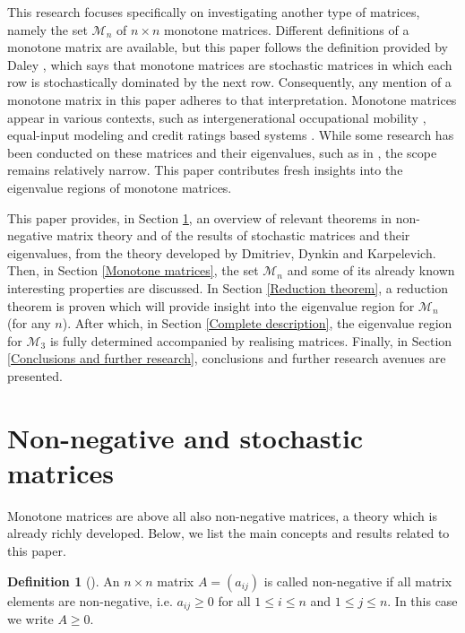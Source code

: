 \documentclass[11pt,a4paper]{article}
\theoremstyle{definition}
\newtheorem{definition}{Definition}[section]
\theoremstyle{remark}
\begin{document}
This research focuses specifically on investigating another type of matrices, namely the set $\mathcal{M}_n$ of $n \times n$ monotone matrices. Different definitions of a monotone matrix are available, but this paper follows the definition provided by Daley \cite{daley1968stochastically}, which says that monotone matrices are stochastic matrices in which each row is stochastically dominated by the next row. Consequently, any mention of a monotone matrix in this paper adheres to that interpretation. Monotone matrices appear in various contexts, such as intergenerational occupational mobility \cite{conlisk1990monotone}, equal-input modeling \cite{baake2022equal} and credit ratings based 
systems \cite{jarrow1997markov}. While some research has been conducted on these matrices and their eigenvalues, such as in \cite{guerry2022monotone}, the scope remains relatively narrow. This paper contributes fresh insights into the eigenvalue regions of monotone matrices.

This paper provides, in Section \ref{Non-negative and stochastic matrices}, an overview of relevant theorems in non-negative matrix theory and of the results of stochastic matrices and their eigenvalues, from the theory developed by Dmitriev, Dynkin and Karpelevich. Then, in Section \ref{Monotone matrices}, the set $\mathcal{M}_n$ and some of its already known interesting properties are discussed. In Section \ref{Reduction theorem}, a reduction theorem is proven which will provide insight into the eigenvalue region for $\mathcal{M}_n$ (for any $n$). After which, in Section \ref{Complete description}, the eigenvalue region for $\mathcal{M}_3$ is fully determined accompanied by realising matrices. Finally, in Section \ref{Conclusions and further research}, conclusions and further research avenues are presented.

\section{Non-negative and stochastic matrices}\label{Non-negative and stochastic matrices}

Monotone matrices are above all also non-negative matrices, a theory which is already richly developed. Below, we list the main concepts and results related to this paper.

\begin{definition}[\cite{seneta1973non}]
    An \(n \times n\) matrix \(A=(a_{ij})\) is called non-negative if all matrix elements are non-negative, i.e. \(a_{ij} \geqslant 0 \) for all \(1 \leqslant i \leqslant n\) and \(1 \leqslant j \leqslant n\). In this case we write \(A \geqslant 0 \).
\end{definition}
\end{document}
